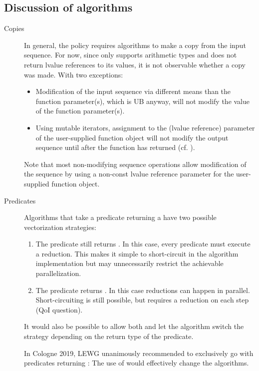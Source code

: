 \subsection{Discussion of algorithms}
\begin{description}
  \item[Copies]
    In general, the \simdEP policy requires algorithms to make a copy from the input sequence.
    For now, since \simd only supports arithmetic types and \simd does not return lvalue references to its values, it is not observable whether a copy was made.
    With two exceptions:
    \begin{itemize}
      \item Modification of the input sequence via different means than the function parameter(s), which is UB anyway, will not modify the value of the function parameter(s).
      \item Using mutable iterators, assignment to the \simd (lvalue reference) parameter of the user-supplied function object will not modify the output sequence until after the function has returned (cf. ).
    \end{itemize}
    Note that most non-modifying sequence operations allow modification of the sequence by using a non-const lvalue reference parameter for the user-supplied function object.

  \item[Predicates] Algorithms that take a predicate returning a \bool have two possible vectorization strategies:
    \begin{enumerate}
      \item The predicate still returns \bool.
        In this case, every predicate must execute a  reduction.
        This makes it simple to short-circuit in the algorithm implementation but may unnecessarily restrict the achievable parallelization.
      \item The predicate returns .
        In this case  reductions can happen in parallel.
        Short-circuiting is still possible, but requires a  reduction on each step (QoI question).
    \end{enumerate}
    It would also be possible to allow both and let the algorithm switch the strategy depending on the return type of the predicate.

    In Cologne 2019, LEWG unanimously recommended to exclusively go with predicates returning :
    The use of \bool would effectively change the algorithms.


\end{description}
